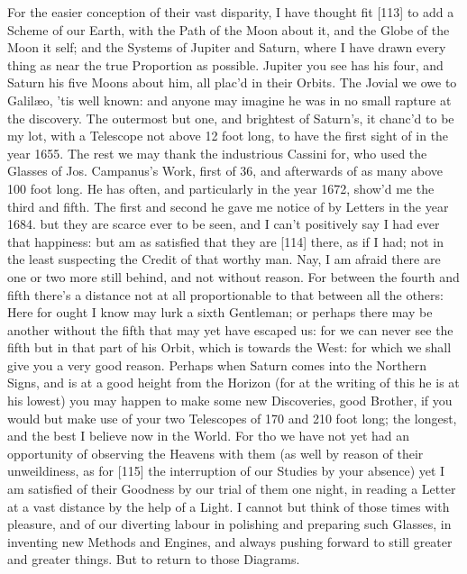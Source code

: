 \documentclass[letterpaper]{book}
\begin{document}
For the easier conception of their vast disparity, I have thought
fit [113] to add a Scheme of our Earth, with the Path of the Moon about it,
and the Globe of the Moon it self; and the Systems of Jupiter and Saturn,
where I have drawn every thing as near the true Proportion as possible.
Jupiter you see has his four, and Saturn his five Moons about him, all
plac'd in their Orbits. The Jovial we owe to Galilæo, 'tis well known: and
anyone may imagine he was in no small rapture at the discovery. The
outermost but one, and brightest of Saturn's, it chanc'd to be my lot, with a
Telescope not above 12 foot long, to have the first sight of in the year
1655. The rest we may thank the industrious Cassini for, who used the
Glasses of Jos.  Campanus's Work, first of 36, and afterwards of as many
above 100 foot long. He has often, and particularly in the year 1672, show'd
me the third and fifth. The first and second he gave me notice of by Letters
in the year 1684. but they are scarce ever to be seen, and I can't
positively say I had ever that happiness: but am as satisfied that they are
[114] there, as if I had; not in the least suspecting the Credit of that
worthy man. Nay, I am afraid there are one or two more still behind, and not
without reason. For between the fourth and fifth there's a distance not at
all proportionable to that between all the others: Here for ought I know may
lurk a sixth Gentleman; or perhaps there may be another without the fifth
that may yet have escaped us: for we can never see the fifth but in that
part of his Orbit, which is towards the West: for which we shall give you a
very good reason.  Perhaps when Saturn comes into the Northern Signs, and is
at a good height from the Horizon (for at the writing of this he is at his
lowest) you may happen to make some new Discoveries, good Brother, if you
would but make use of your two Telescopes of 170 and 210 foot long; the
longest, and the best I believe now in the World. For tho we have not yet
had an opportunity of observing the Heavens with them (as well by reason of
their unweildiness, as for [115] the interruption of our Studies by your
absence) yet I am satisfied of their Goodness by our trial of them one
night, in reading a Letter at a vast distance by the help of a Light. I
cannot but think of those times with pleasure, and of our diverting labour
in polishing and preparing such Glasses, in inventing new Methods and
Engines, and always pushing forward to still greater and greater things. But
to return to those Diagrams.
\end{document}
